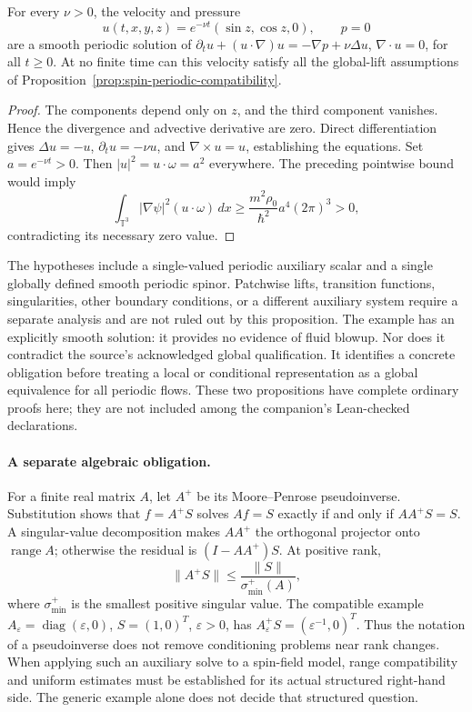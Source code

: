 \begin{proposition}
\label{prop:spin-beltrami-obstruction}
For every $\nu>0$, the velocity and pressure
\[
 u(t,x,y,z)=e^{-\nu t}(\sin z,\cos z,0),\qquad p=0
\]
are a smooth periodic solution of
$\partial_tu+(u\cdot\nabla)u=-\nabla p+\nu\Delta u$,
$\nabla\cdot u=0$, for all $t\geq0$.
At no finite time can this velocity satisfy all the global-lift assumptions of Proposition~\ref{prop:spin-periodic-compatibility}.
\end{proposition}
\begin{proof}
The components depend only on $z$, and the third component vanishes. Hence the divergence and advective derivative are zero. Direct differentiation gives $\Delta u=-u$, $\partial_tu=-\nu u$, and $\nabla\times u=u$, establishing the equations. Set $a=e^{-\nu t}>0$. Then $|u|^2=u\cdot\omega=a^2$ everywhere. The preceding pointwise bound would imply
\[
 \int_{\mathbb T^3}|\nabla\psi|^2(u\cdot\omega)\,dx
 \geq\frac{m^2\rho_0}{\hbar^2}a^4(2\pi)^3>0,
\]
contradicting its necessary zero value.
\end{proof}

The hypotheses include a single-valued periodic auxiliary scalar and a single globally defined smooth periodic spinor. Patchwise lifts, transition functions, singularities, other boundary conditions, or a different auxiliary system require a separate analysis and are not ruled out by this proposition. The example has an explicitly smooth solution: it provides no evidence of fluid blowup. Nor does it contradict the source's acknowledged global qualification. It identifies a concrete obligation before treating a local or conditional representation as a global equivalence for all periodic flows. These two propositions have complete ordinary proofs here; they are not included among the companion's Lean-checked declarations.

\paragraph{A separate algebraic obligation.}
For a finite real matrix $A$, let $A^+$ be its Moore--Penrose pseudoinverse. Substitution shows that $f=A^+S$ solves $Af=S$ exactly if and only if $AA^+S=S$. A singular-value decomposition makes $AA^+$ the orthogonal projector onto $\operatorname{range}A$; otherwise the residual is $(I-AA^+)S$. At positive rank,
\[
 \|A^+S\|\leq\frac{\|S\|}{\sigma_{\min}^+(A)},
\]
where $\sigma_{\min}^+$ is the smallest positive singular value. The compatible example $A_\varepsilon=\operatorname{diag}(\varepsilon,0)$, $S=(1,0)^T$, $\varepsilon>0$, has $A_\varepsilon^+S=(\varepsilon^{-1},0)^T$. Thus the notation of a pseudoinverse does not remove conditioning problems near rank changes. When applying such an auxiliary solve to a spin-field model, range compatibility and uniform estimates must be established for its actual structured right-hand side. The generic example alone does not decide that structured question.
